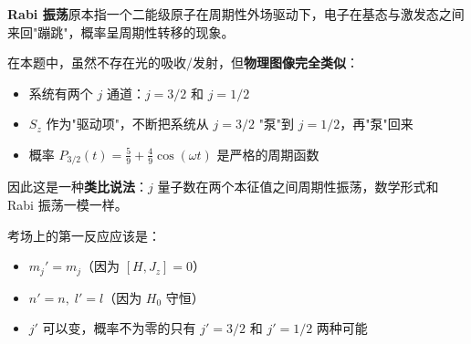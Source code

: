 \textbf{Rabi 振荡}原本指一个二能级原子在周期性外场驱动下，电子在基态与激发态之间来回"蹦跳"，概率呈周期性转移的现象。

在本题中，虽然不存在光的吸收/发射，但\textbf{物理图像完全类似}：
\begin{itemize}[nosep]
    \item 系统有两个 $j$ 通道：$j=3/2$ 和 $j=1/2$
    \item $S_z$ 作为"驱动项"，不断把系统从 $j=3/2$ "泵"到 $j=1/2$，再"泵"回来
    \item 概率 $P_{3/2}(t) = \frac{5}{9} + \frac{4}{9}\cos(\omega t)$ 是严格的周期函数
\end{itemize}

因此这是一种\textbf{类比说法}：$j$ 量子数在两个本征值之间周期性振荡，数学形式和 Rabi 振荡一模一样。

考场上的第一反应应该是：
\begin{itemize}[nosep]
    \item $m_j' = m_j$（因为 $[H, J_z]=0$）
    \item $n'=n,\; l'=l$（因为 $H_0$ 守恒）
    \item $j'$ 可以变，概率不为零的只有 $j'=3/2$ 和 $j'=1/2$ 两种可能
\end{itemize}

